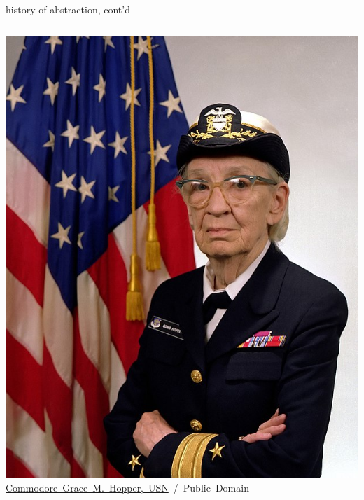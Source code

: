 \documentclass[10pt,t,svgnames]{beamer}
\begin{document}
  \begin{frame}{history of abstraction, cont'd}
    \vspace{3ex}
    \begin{columns}
      \begin{column}{.52\textwidth}
        \includegraphics[width=\textwidth]{Grace_Hopper.jpg}\\
        \hfill
        \tiny{\href{https://en.wikipedia.org/wiki/File:Commodore\_Grace\_M.\_Hopper,\_USN\_(covered).jpg}{Commodore~Grace~M.~Hopper,~USN}~/~Public~Domain}
      \end{column}
    \end{columns}



\end{frame}
\end{document}
